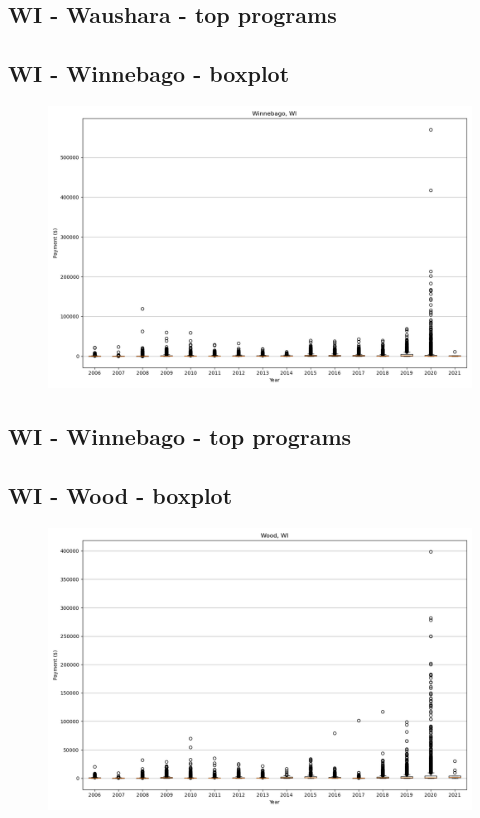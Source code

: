 \subsection*{WI - Waushara - top programs}

\newpage
\subsection*{WI - Winnebago - boxplot}
\begin{figure}[h]
\centering
\includegraphics[width=7in]{../output/boxplots/counties/Winnebago-WI_boxplot.png}
\end{figure}


\subsection*{WI - Winnebago - top programs}

\newpage
\subsection*{WI - Wood - boxplot}
\begin{figure}[h]
\centering
\includegraphics[width=7in]{../output/boxplots/counties/Wood-WI_boxplot.png}
\end{figure}


